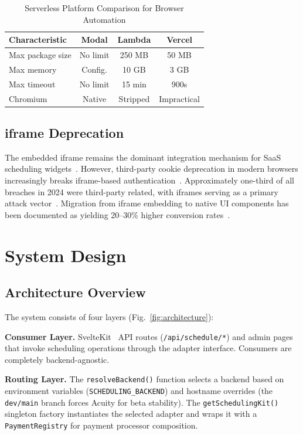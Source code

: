 \documentclass[conference]{IEEEtran}
\begin{document}
\begin{table}[htbp]
\caption{Serverless Platform Comparison for Browser Automation}
\label{tab:runtimes}
\centering
\begin{tabular}{@{}lccc@{}}
\toprule
\textbf{Characteristic} & \textbf{Modal} & \textbf{Lambda} & \textbf{Vercel} \\
\midrule
Max package size & No limit & 250 MB & 50 MB \\
Max memory & Config. & 10 GB & 3 GB \\
Max timeout & No limit & 15 min & 900s \\
Chromium & Native & Stripped & Impractical \\
\bottomrule
\end{tabular}
\end{table}

\subsection{iframe Deprecation}

The embedded iframe remains the dominant integration mechanism for SaaS scheduling widgets~\cite{acuity-embed}. However, third-party cookie deprecation in modern browsers increasingly breaks iframe-based authentication~\cite{smashing-cookies}. Approximately one-third of all breaches in 2024 were third-party related, with iframes serving as a primary attack vector~\cite{qrvey-iframe}. Migration from iframe embedding to native UI components has been documented as yielding 20--30\% higher conversion rates~\cite{cloudbeds-iframe}.

\section{System Design}

\subsection{Architecture Overview}

The system consists of four layers (Fig.~\ref{fig:architecture}):

\textbf{Consumer Layer.} SvelteKit~\cite{sveltekit} API routes (\texttt{/api/schedule/*}) and admin pages that invoke scheduling operations through the adapter interface. Consumers are completely backend-agnostic.

\textbf{Routing Layer.} The \texttt{resolveBackend()} function selects a backend based on environment variables (\texttt{SCHEDULING\_BACKEND}) and hostname overrides (the \texttt{dev/main} branch forces Acuity for beta stability). The \texttt{getSchedulingKit()} singleton factory instantiates the selected adapter and wraps it with a \texttt{PaymentRegistry} for payment processor composition.
\end{document}
